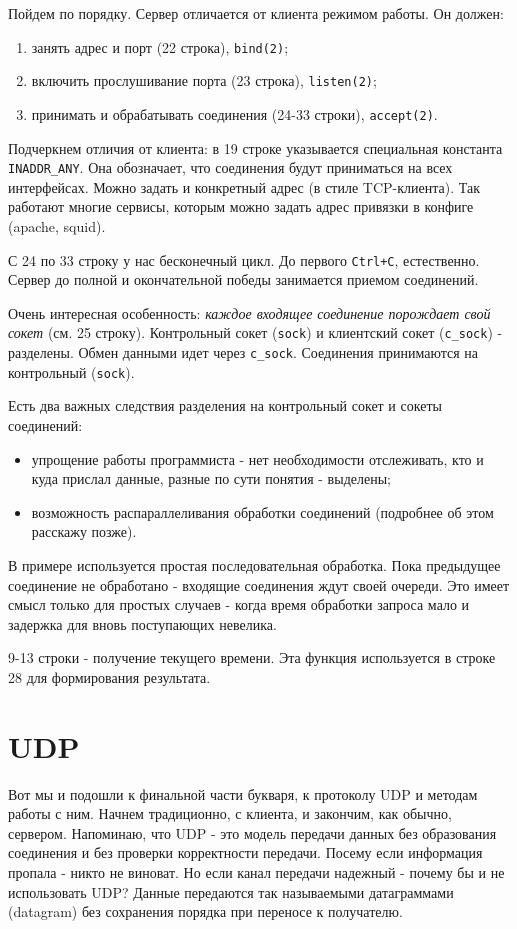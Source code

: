 Пойдем по порядку. Сервер отличается от клиента режимом работы. Он должен:
\begin{enumerate}
\item занять адрес и порт (22 строка), \verb+bind(2)+;
\item включить прослушивание порта (23 строка), \verb+listen(2)+;
\item принимать и обрабатывать соединения (24-33 строки), \verb+accept(2)+.
\end{enumerate}

Подчеркнем отличия от клиента: в 19 строке указывается специальная константа \verb+INADDR_ANY+. Она обозначает, что соединения будут приниматься на всех интерфейсах. Можно задать и конкретный адрес (в стиле TCP-клиента). Так работают многие сервисы, которым можно задать адрес привязки в конфиге (apache, squid).

С 24 по 33 строку у нас бесконечный цикл. До первого \verb-Ctrl+C-, естественно. Сервер до полной и окончательной победы занимается приемом соединений.

Очень интересная особенность: \emph{каждое входящее соединение порождает свой сокет} (см. 25 строку). Контрольный сокет (\verb+sock+) и клиентский сокет (\verb+c_sock+) - разделены. Обмен данными идет через \verb+c_sock+. Соединения принимаются на контрольный (\verb+sock+).

Есть два важных следствия разделения на контрольный сокет и сокеты соединений:
\begin{itemize}
\item  упрощение работы программиста - нет необходимости отслеживать, кто и куда прислал данные, разные по сути понятия - выделены;
\item возможность распараллеливания обработки соединений (подробнее об этом расскажу позже).
\end{itemize}
В примере используется простая последовательная обработка. Пока предыдущее соединение не обработано - входящие соединения ждут своей очереди. Это имеет смысл только для простых случаев - когда время обработки запроса мало и задержка для вновь поступающих невелика.

9-13 строки - получение текущего времени. Эта функция используется в строке 28 для формирования результата.

\section{UDP}
Вот мы и подошли к финальной части букваря, к протоколу UDP и методам работы с ним.
Начнем традиционно, с клиента, и закончим, как обычно, сервером.
Напоминаю, что UDP - это модель передачи данных без образования соединения и без проверки корректности передачи. Посему если информация пропала - никто не виноват. Но если канал передачи надежный - почему бы и не использовать UDP?
Данные передаются так называемыми датаграммами (datagram) без сохранения порядка при переносе к получателю.

